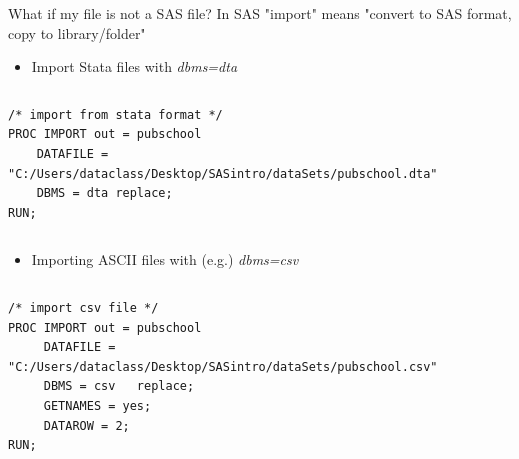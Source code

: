 \documentclass[table,smaller]{beamer}
\begin{document}
\begin{frame}[fragile,label=sec-2-3]{What if my file is not a SAS file?}
 In SAS "import" means "convert to SAS format, copy to library/folder"

\begin{itemize}
\item Import Stata files with \emph{dbms=dta}
\end{itemize}
\vspace{-.75em} \begin{columns}  \begin{block}{}
\begin{verbatim}
/* import from stata format */
PROC IMPORT out = pubschool
    DATAFILE = "C:/Users/dataclass/Desktop/SASintro/dataSets/pubschool.dta"
    DBMS = dta replace;
RUN;
\end{verbatim}
\end{block} \end{columns} \vspace{.25em}

\begin{itemize}
\item Importing ASCII files with (e.g.) \emph{dbms=csv}
\end{itemize}
\vspace{-.75em} \begin{columns}  \begin{block}{}
\begin{verbatim}
/* import csv file */
PROC IMPORT out = pubschool
     DATAFILE = "C:/Users/dataclass/Desktop/SASintro/dataSets/pubschool.csv"
     DBMS = csv   replace;
     GETNAMES = yes;
     DATAROW = 2;
RUN;
\end{verbatim}
\end{block} \end{columns} \vspace{.25em}
\end{frame}
\end{document}
